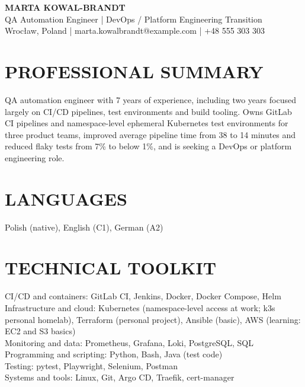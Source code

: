 \documentclass[11pt,a4paper]{article}
\begin{document}
\begin{center}
{\LARGE\bfseries MARTA KOWAL-BRANDT}\\
QA Automation Engineer | DevOps / Platform Engineering Transition\\
Wrocław, Poland | marta.kowalbrandt@example.com | +48 555 303 303
\end{center}

\section*{PROFESSIONAL SUMMARY}
QA automation engineer with 7 years of experience, including two years focused largely on CI/CD pipelines, test environments and build tooling. Owns GitLab CI pipelines and namespace-level ephemeral Kubernetes test environments for three product teams, improved average pipeline time from 38 to 14 minutes and reduced flaky tests from 7\% to below 1\%, and is seeking a DevOps or platform engineering role.

\section*{LANGUAGES}
Polish (native), English (C1), German (A2)

\section*{TECHNICAL TOOLKIT}
CI/CD and containers: GitLab CI, Jenkins, Docker, Docker Compose, Helm\\
Infrastructure and cloud: Kubernetes (namespace-level access at work; k3s personal homelab), Terraform (personal project), Ansible (basic), AWS (learning: EC2 and S3 basics)\\
Monitoring and data: Prometheus, Grafana, Loki, PostgreSQL, SQL\\
Programming and scripting: Python, Bash, Java (test code)\\
Testing: pytest, Playwright, Selenium, Postman\\
Systems and tools: Linux, Git, Argo CD, Traefik, cert-manager
\end{document}
